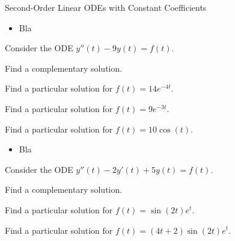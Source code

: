 	



\standardonlynewpage

%
%



\begin{module}{Second-Order Linear ODEs with Constant Coefficients}
	\label{2nd:solving}

	
	
\end{module}



\begin{lesson}

	\begin{itemize}
		\item Bla
	\end{itemize}
	

\end{lesson}




\question
	Consider the ODE \quad $y''(t) -9y(t) = f(t)$.
\begin{parts}
	\item Find a complementary solution.
	\item Find a particular solution for $f(t) = 14 e^{-4t}$.
	\item Find a particular solution for $f(t) = 9 e^{-3t}$.
	\item Find a particular solution for $f(t) = 10\cos(t)$.
\end{parts}

\bookonlynewpage

\begin{lesson}

	\begin{itemize}
		\item Bla
	\end{itemize}
	

\end{lesson}

\question
	Consider the ODE \quad $y''(t) -2y'(t)+5y(t) = f(t)$. %
\begin{parts}
	\item Find a complementary solution.
	\item Find a particular solution for $f(t) = \sin(2t)e^t$.
	\item Find a particular solution for $f(t) = (4t+2)\sin(2t)e^t$.
\end{parts}




